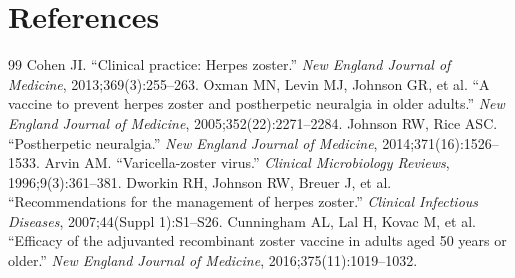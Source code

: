\section*{References}
\begin{thebibliography}{99}
 Cohen JI. ``Clinical practice: Herpes zoster.'' \textit{New England Journal of Medicine}, 2013;369(3):255--263.
 Oxman MN, Levin MJ, Johnson GR, et al. ``A vaccine to prevent herpes zoster and postherpetic neuralgia in older adults.'' \textit{New England Journal of Medicine}, 2005;352(22):2271--2284.
 Johnson RW, Rice ASC. ``Postherpetic neuralgia.'' \textit{New England Journal of Medicine}, 2014;371(16):1526--1533.
 Arvin AM. ``Varicella-zoster virus.'' \textit{Clinical Microbiology Reviews}, 1996;9(3):361--381.
 Dworkin RH, Johnson RW, Breuer J, et al. ``Recommendations for the management of herpes zoster.'' \textit{Clinical Infectious Diseases}, 2007;44(Suppl 1):S1--S26.
 Cunningham AL, Lal H, Kovac M, et al. ``Efficacy of the adjuvanted recombinant zoster vaccine in adults aged 50 years or older.'' \textit{New England Journal of Medicine}, 2016;375(11):1019--1032.
\end{thebibliography}
